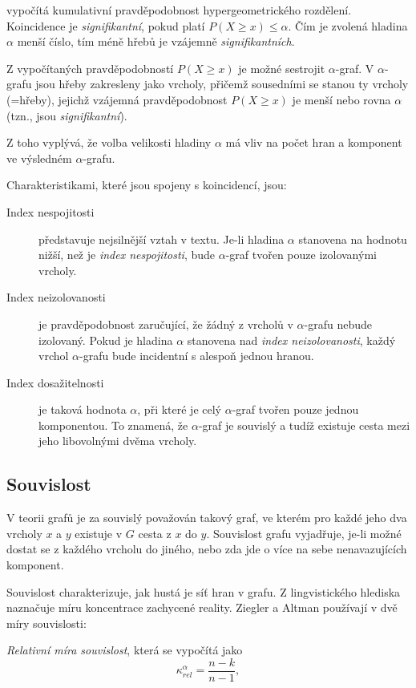 \documentclass[dp.tex]{subfiles}
\begin{document}
vypočítá kumulativní pravděpodobnost hypergeometrického rozdělení. Koincidence je \textit{signifikantní}, pokud platí $P(X \geq x)\leq \alpha$. Čím je zvolená hladina $\alpha$ menší číslo, tím méně hřebů je vzájemně \textit{signifikantních}.

Z vypočítaných pravděpodobností $P(X \geq x)$ je možné sestrojit $\alpha$-graf. V $\alpha$-grafu jsou hřeby zakresleny jako vrcholy, přičemž sousedními se stanou ty vrcholy (=hřeby), jejichž vzájemná pravděpodobnost $P(X \geq x)$ je menší nebo rovna $\alpha$ (tzn., jsou \textit{signifikantní}).

Z toho vyplývá, že volba velikosti hladiny $\alpha$ má vliv na počet hran a komponent ve výsledném $\alpha$-grafu. 

Charakteristikami, které jsou spojeny s koincidencí, jsou:
\begin{description}
	\item[Index nespojitosti] představuje nejsilnější vztah v textu. Je-li hladina $\alpha$ stanovena na hodnotu nižší, než je \textit{index nespojitosti}, bude $\alpha$-graf tvořen pouze izolovanými vrcholy.
	\item[Index neizolovanosti] je pravděpodobnost zaručující, že žádný z vrcholů v $\alpha$-grafu nebude izolovaný. Pokud je hladina $\alpha$ stanovena nad \textit{index neizolovanosti}, každý vrchol $\alpha$-grafu bude incidentní s alespoň jednou hranou.
	\item[Index dosažitelnosti] je taková hodnota $\alpha$, při které je celý $\alpha$-graf tvořen pouze jednou komponentou. To znamená, že $\alpha$-graf je souvislý a tudíž existuje cesta mezi jeho libovolnými dvěma vrcholy.
\end{description}

\subsection{Souvislost}
V teorii grafů je za souvislý považován takový graf, ve kterém pro každé jeho dva vrcholy $x$ a $y$ existuje v $G$ cesta z $x$ do $y$. Souvislost grafu vyjadřuje, je-li možné dostat se z každého vrcholu do jiného, nebo zda jde o více na sebe nenavazujících komponent.

Souvislost charakterizuje, jak hustá je síť hran v grafu. Z lingvistického hlediska naznačuje míru koncentrace zachycené reality. Ziegler a Altman používají v \cite{ZieglerAltmann2002} dvě míry souvislosti:

\textit{Relativní míra souvislost}, která se vypočítá jako
\begin{equation}
\kappa_\textit{rel}^\alpha=\frac{n-k}{n-1},
\end{equation}
\end{document}
